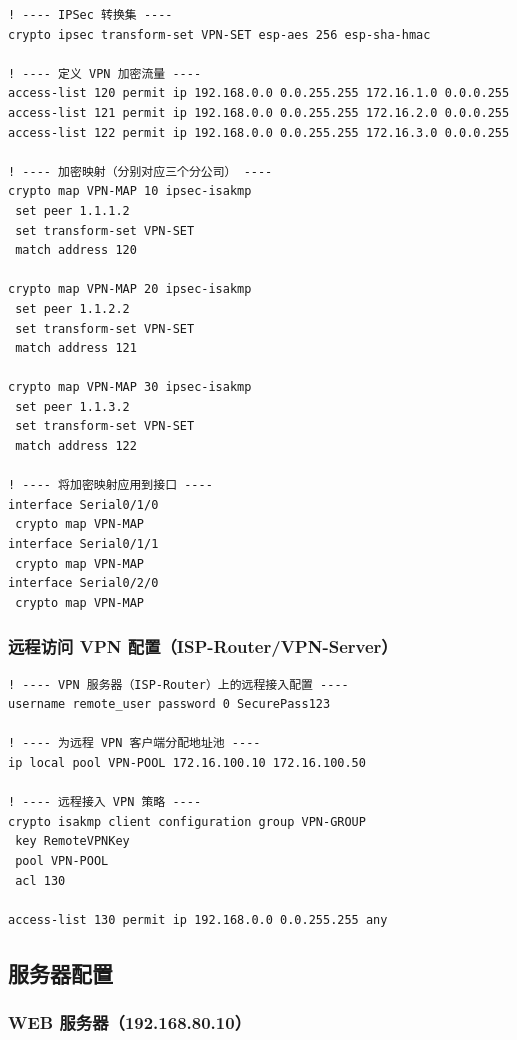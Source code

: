 \documentclass[12pt,a4paper]{ctexart}
\begin{document}
\begin{lstlisting}[caption={IPSec VPN Phase 2 — 转换集与加密映射}, label={lst:vpn-ipsec}]
! ---- IPSec 转换集 ----
crypto ipsec transform-set VPN-SET esp-aes 256 esp-sha-hmac

! ---- 定义 VPN 加密流量 ----
access-list 120 permit ip 192.168.0.0 0.0.255.255 172.16.1.0 0.0.0.255
access-list 121 permit ip 192.168.0.0 0.0.255.255 172.16.2.0 0.0.0.255
access-list 122 permit ip 192.168.0.0 0.0.255.255 172.16.3.0 0.0.0.255

! ---- 加密映射（分别对应三个分公司） ----
crypto map VPN-MAP 10 ipsec-isakmp
 set peer 1.1.1.2
 set transform-set VPN-SET
 match address 120

crypto map VPN-MAP 20 ipsec-isakmp
 set peer 1.1.2.2
 set transform-set VPN-SET
 match address 121

crypto map VPN-MAP 30 ipsec-isakmp
 set peer 1.1.3.2
 set transform-set VPN-SET
 match address 122

! ---- 将加密映射应用到接口 ----
interface Serial0/1/0
 crypto map VPN-MAP
interface Serial0/1/1
 crypto map VPN-MAP
interface Serial0/2/0
 crypto map VPN-MAP
\end{lstlisting}

\subsubsection{远程访问 VPN 配置（ISP-Router/VPN-Server）}

\begin{lstlisting}[caption={远程访问 VPN 配置}, label={lst:vpn-remote}]
! ---- VPN 服务器（ISP-Router）上的远程接入配置 ----
username remote_user password 0 SecurePass123

! ---- 为远程 VPN 客户端分配地址池 ----
ip local pool VPN-POOL 172.16.100.10 172.16.100.50

! ---- 远程接入 VPN 策略 ----
crypto isakmp client configuration group VPN-GROUP
 key RemoteVPNKey
 pool VPN-POOL
 acl 130

access-list 130 permit ip 192.168.0.0 0.0.255.255 any
\end{lstlisting}

\subsection{服务器配置}

\subsubsection{WEB 服务器（192.168.80.10）}
\end{document}
